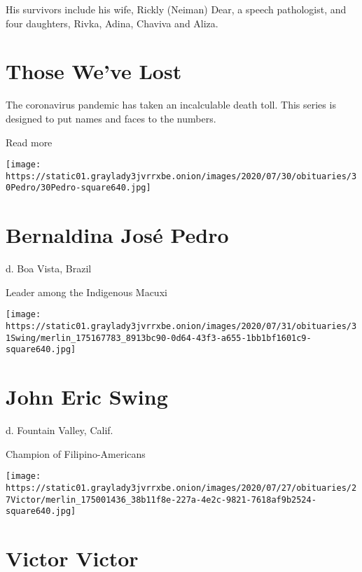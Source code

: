 His survivors include his wife, Rickly (Neiman) Dear, a speech
pathologist, and four daughters, Rivka, Adina, Chaviva and Aliza.

\href{https://www.nytimes3xbfgragh.onion/interactive/2020/obituaries/people-died-coronavirus-obituaries.html?action=click\&pgtype=Article\&state=default\&region=BELOW_MAIN_CONTENT\&context=covid_obits_promo}{}

\hypertarget{those-weve-lost}{%
\section{Those We've Lost}\label{those-weve-lost}}

The coronavirus pandemic has taken an incalculable death toll. This
series is designed to put names and faces to the numbers.

Read more

\texttt{[image: https://static01.graylady3jvrrxbe.onion/images/2020/07/30/obituaries/30Pedro/30Pedro-square640.jpg]}

\hypertarget{bernaldina-josuxe9-pedro}{%
\section{Bernaldina José Pedro}\label{bernaldina-josuxe9-pedro}}

d. Boa Vista, Brazil

Leader among the Indigenous Macuxi

\texttt{[image: https://static01.graylady3jvrrxbe.onion/images/2020/07/31/obituaries/31Swing/merlin\_175167783\_8913bc90-0d64-43f3-a655-1bb1bf1601c9-square640.jpg]}

\hypertarget{john-eric-swing}{%
\section{John Eric Swing}\label{john-eric-swing}}

d. Fountain Valley, Calif.

Champion of Filipino-Americans

\texttt{[image: https://static01.graylady3jvrrxbe.onion/images/2020/07/27/obituaries/27Victor/merlin\_175001436\_38b11f8e-227a-4e2c-9821-7618af9b2524-square640.jpg]}

\hypertarget{victor-victor}{%
\section{Victor Victor}\label{victor-victor}}

